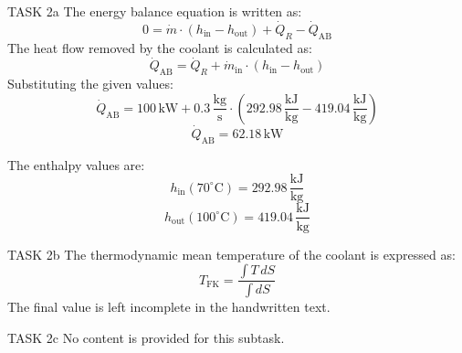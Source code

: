 TASK 2a  
The energy balance equation is written as:  
\[
0 = \dot{m} \cdot (h_{\text{in}} - h_{\text{out}}) + \dot{Q}_R - \dot{Q}_{\text{AB}}
\]  
The heat flow removed by the coolant is calculated as:  
\[
\dot{Q}_{\text{AB}} = \dot{Q}_R + \dot{m}_{\text{in}} \cdot (h_{\text{in}} - h_{\text{out}})
\]  
Substituting the given values:  
\[
\dot{Q}_{\text{AB}} = 100 \, \text{kW} + 0.3 \, \frac{\text{kg}}{\text{s}} \cdot (292.98 \, \frac{\text{kJ}}{\text{kg}} - 419.04 \, \frac{\text{kJ}}{\text{kg}})
\]  
\[
\dot{Q}_{\text{AB}} = 62.18 \, \text{kW}
\]  

The enthalpy values are:  
\[
h_{\text{in}}(70^\circ\text{C}) = 292.98 \, \frac{\text{kJ}}{\text{kg}}
\]  
\[
h_{\text{out}}(100^\circ\text{C}) = 419.04 \, \frac{\text{kJ}}{\text{kg}}
\]  

TASK 2b  
The thermodynamic mean temperature of the coolant is expressed as:  
\[
T_{\text{FK}} = \frac{\int T \, dS}{\int dS}
\]  
The final value is left incomplete in the handwritten text.  

TASK 2c  
No content is provided for this subtask.